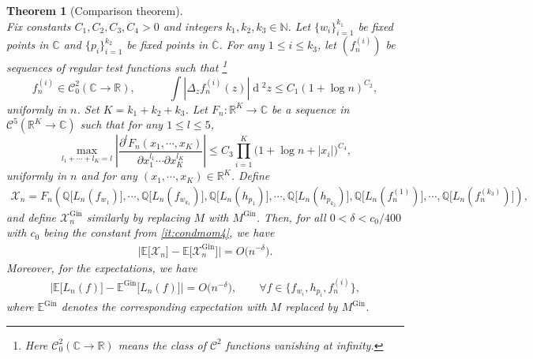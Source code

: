 \documentclass[10pt,reqno]{amsart}
\numberwithin{equation}{section}
\numberwithin{figure}{section}
\theoremstyle{plain}
\newtheorem{theorem}{Theorem}[section]
\newcommand{\R}{{\mathbb{R}}}
\newcommand{\C}{{\mathbb{C}}}
\newcommand{\<}{\langle}
\renewcommand{\>}{\rangle}
\newcommand{\E}{\mathbb{E}}
\newcommand{\dd}{\operatorname{d}\!{}}
\begin{document}
\begin{theorem}[Comparison theorem]\label{th:replacement}\ \\
    Fix constants $C_1,C_2,C_3,C_4>0$ and integers $k_1,k_2,k_3\in \mathbb{N}$. Let $\{w_i\}_{i=1}^{k_1}$ be fixed points in $\mathbb{C}$ and $\{p_i\}_{i=1}^{k_2}$ be fixed points in $\overline{\mathbb{C}}$.   
     For any $1\leq i\leq k_3$, let $(f^{(i)}_n)$ be sequences of regular test functions such that {\footnote{Here $\mathcal{C}_0^{2}(\C\to\mathbb{R})$ means the class of $\mathcal{C}^2$ functions vanishing at infinity.}}
     \begin{equation}\label{eq_f}
     f^{(i)}_n \in\mathcal{C}_0^{2}(\C\to\mathbb{R}),
     \qquad\quad  \int|\Delta_z f^{(i)}_n(z)| \dd^2 z  \leq C_1(1+\log n)^{C_2},
     \end{equation}
     uniformly in $n$. Set $K=k_1+k_2+k_3$. Let $F_n:\mathbb{R}^{K}\to\mathbb{C}$ be a sequence in $\mathcal{C}^{5}(\R^K \to\mathbb{C})$ such that for any $1\leq l\leq 5$,
     \begin{equation}\label{eq_F}
    \max_{l_1+\cdots+l_{K}=l}\left|\frac{\partial^{l} F_n(x_1,\cdots, x_{K})}{\partial x_1^{l_1} \cdots \partial x_K^{l_K}}\right| \leq C_3\prod_{i=1}^K\Big(1+\log n +|x_i|\Big)^{C_4},
     \end{equation}
     uniformly in $n$ and for any $(x_1,\cdots, x_K)\in \R^K$. Define 
\begin{align}\label{XX}
\mathcal{X}_n=F_n\left(\mathbb{Q}\big[L_n(f_{w_1})\big], \cdots , \mathbb{Q}\big[L_n(f_{w_{k_1}})\big], \mathbb{Q}\big[L_n(h_{p_1})\big], \cdots , \mathbb{Q}\big[L_n(h_{p_{k_2}})\big],\mathbb{Q}\big[L_n(f_n^{(1)})\big],\cdots, \mathbb{Q}\big[L_n(f_n^{(k_3)})\big] \right),
\end{align}
     and define $\mathcal{X}^{\mathrm{Gin}}_n$ similarly by replacing  $M$ with $M^{\mathrm{Gin}}$. Then, for all $0<\delta<c_0/400$ with $c_0$ being the constant from \ref{it:condmom4}, we have
    \begin{align}\label{eq_diff}
    \Big|\mathbb{E}\big[\mathcal{X}_n\big]
    -\mathbb{E}\big[\mathcal{X}^{\mathrm{Gin}}_n\big]\Big| =O\big( n^{-\delta}\big).
    \end{align}
    Moreover,  for the expectations, we have 
    \begin{align}\label{eq_diff_mean}
    	\Big|\E\big[L_n(f)\big] 
    	-\E^{\mathrm{Gin}}\big[L_n(f)\big]\Big| =O\big( n^{-\delta}\big), \qquad \forall f \in \Big\{ f_{w_i},h_{p_i}, f^{(i)}_n\Big\},
    \end{align}
where $\E^{\mathrm{Gin}}$ denotes the corresponding expectation with $M$ replaced by $M^{\mathrm{Gin}}$.
\end{theorem}
\end{document}

